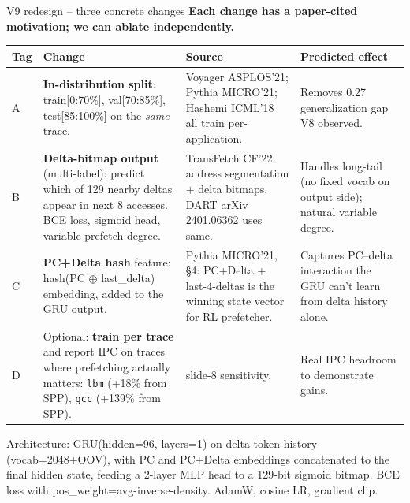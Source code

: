 \documentclass[10pt,aspectratio=169]{beamer}
\begin{document}
\begin{frame}{V9 redesign -- three concrete changes}
  \textbf{Each change has a paper-cited motivation; we can ablate independently.}

  \vspace{0.5em}
  \begin{center}
  \scriptsize
  \begin{tabular}{p{1.0cm}p{4.4cm}p{3.6cm}p{4.0cm}}
    \toprule
    \textbf{Tag} & \textbf{Change} & \textbf{Source} & \textbf{Predicted effect} \\
    \midrule
    A & \textbf{In-distribution split}: train[0:70\%], val[70:85\%], test[85:100\%] on the \emph{same} trace. & Voyager ASPLOS'21; Pythia MICRO'21; Hashemi ICML'18 all train per-application. & Removes 0.27 generalization gap V8 observed. \\

    B & \textbf{Delta-bitmap output} (multi-label): predict which of 129 nearby deltas appear in next 8 accesses. BCE loss, sigmoid head, variable prefetch degree. & TransFetch CF'22: address segmentation $+$ delta bitmaps. DART arXiv 2401.06362 uses same. & Handles long-tail (no fixed vocab on output side); natural variable degree. \\

    C & \textbf{PC+Delta hash} feature: hash(PC $\oplus$ last\_delta) embedding, added to the GRU output. & Pythia MICRO'21, \S 4: PC+Delta + last-4-deltas is the winning state vector for RL prefetcher. & Captures PC--delta interaction the GRU can't learn from delta history alone. \\
    \midrule
    D & Optional: \textbf{train per trace} and report IPC on traces where prefetching actually matters: \texttt{lbm} (+18\% from SPP), \texttt{gcc} (+139\% from SPP). & slide-8 sensitivity. & Real IPC headroom to demonstrate gains. \\
    \bottomrule
  \end{tabular}
  \end{center}

  \vspace{0.5em}
  \footnotesize
  Architecture: GRU(hidden=96, layers=1) on delta-token history (vocab=2048+OOV),
  with PC and PC+Delta embeddings concatenated to the final hidden state,
  feeding a 2-layer MLP head to a 129-bit sigmoid bitmap. BCE loss with
  pos\_weight=avg-inverse-density. AdamW, cosine LR, gradient clip.
\end{frame}
\end{document}
